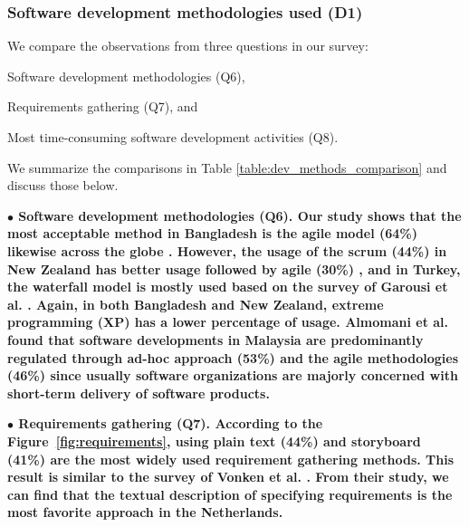 \subsubsection{Software development methodologies used (D1)}\label{sec:rq2-d1}

We compare the observations from three questions in our survey: \begin{inparaenum}
\item Software development methodologies (Q6),
\item Requirements gathering (Q7), and
\item Most time-consuming software development activities (Q8).
\end{inparaenum} We summarize the comparisons in Table \ref{table:dev_methods_comparison} and discuss those below.

\nd\bf{$\bullet$ Software development methodologies (Q6).} Our study shows that
the most acceptable method in Bangladesh is the agile model (64\%) likewise
across the globe \citep{StackoverflowSurvey2018}. However, the usage of the
scrum (44\%) in New Zealand has better usage followed by agile (30\%)
\citep{Wang2018}, and in Turkey, the waterfall model is mostly used based on the
survey of Garousi et al. \citep{Garousi2015}. Again, in both Bangladesh and New
Zealand, extreme programming (XP) has a lower percentage of usage. Almomani et
al. \citep{Almomani2015} found that software developments in Malaysia are
predominantly regulated through ad-hoc approach (53\%) and the agile
methodologies (46\%) since usually software organizations are majorly concerned
with short-term delivery of software products.

\nd\bf{$\bullet$ Requirements gathering (Q7).} According to the
Figure~\ref{fig:requirements}, using plain text (44\%) and storyboard (41\%) are
the most widely used requirement gathering methods. This result is similar to
the survey of Vonken et al. \citep{Vonken2012}. From their study, we can find
that the textual description of specifying requirements is the most favorite
approach in the Netherlands.


